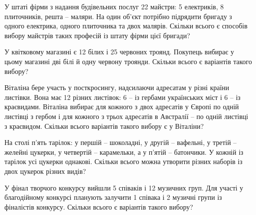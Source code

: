 \documentclass[12pt]{article}
\begin{document}
\begin{samepage}
\noindent\zadnum У штаті фірми з надання будівельних послуг 22 майстри: 5 електриків, 8 плиточників, решта – маляри. На один об'єкт потрібно підрядити бригаду з одного електрика, одного плиточника та двох малярів. Скільки всього є способів вибору майстрів таких професій із штату фірми цієї бригади? 

\nmtnobreak
\nopagebreak\nbvspace{0.5cm}
\nmtAnswerBox
\par{}
\end{samepage}

\begin{samepage}
\noindent\zadnum У квітковому магазині є 12 білих і 25 червоних троянд. Покупець вибирає у цьому магазині дві білі й одну червону троянди. Скільки всього є варіантів такого вибору? 

\nmtnobreak
\nopagebreak\nbvspace{0.5cm}
\nmtAnswerBox
\par{}
\end{samepage}

\begin{samepage}
\noindent\zadnum Віталіна бере участь у посткросингу, надсилаючи адресатам у різні країни листівки. Вона має 12 різних листівок: 6 – із гербами українських міст і 6 – із краєвидами. Віталіна вибирає для кожного з двох адресатів у Європі по одній листівці з гербом і для кожного з трьох адресатів в Австралії – по одній листівці з краєвидом. Скільки всього варіантів такого вибору є у Віталіни? 

\nmtnobreak
\nopagebreak\nbvspace{0.5cm}
\nmtAnswerBox
\par{}
\end{samepage}

\begin{samepage}
\noindent\zadnum На столі п'ять тарілок: у першій – шоколадні, у другій – вафельні, у третій – желейні цукерки, у четвертій – карамельки, а у п'ятій – батончики. У кожній із тарілок усі цукерки однакові. Скільки всього можна утворити різних наборів із двох цукерок різних видів? 

\nmtnobreak
\nopagebreak\nbvspace{0.5cm}
\nmtAnswerBox
\par{}
\end{samepage}

\begin{samepage}
\noindent\zadnum У фінал творчого конкурсу вийшли 5 співаків і 12 музичних груп. Для участі у благодійному конкурсі планують залучити 1 співака і 2 музичні групи із фіналістів конкурсу. Скільки всього є варіантів такого вибору? 

\nmtnobreak
\nopagebreak\nbvspace{0.5cm}
\nmtAnswerBox
\par{}
\end{samepage}
\end{document}
